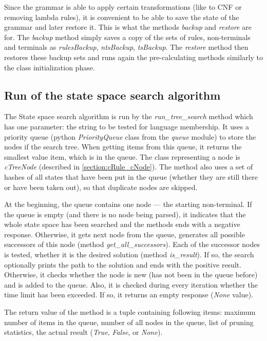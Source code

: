 Since the grammar is able to apply certain transformations (like to CNF or removing lambda rules), it is convenient to be able to save the state of the grammar and later restore it. This is what the methods \textit{backup} and \textit{restore} are for. The \textit{backup} method simply saves a copy of the sets of rules, non-terminals and terminals as \textit{rulesBackup}, \textit{ntsBackup}, \textit{tsBackup}. The \textit{restore} method then restores these backup sets and runs again the pre-calculating methods similarly to the class initialization phase.

\subsection{Run of the state space search algorithm}
The State space search algorithm is run by the \textit{run\_tree\_search} method which has one parameter: the string to be tested for language membership. It uses a priority queue (python \textit{PriorityQueue} class from the \textit{queue} module) to store the nodes if the search tree. When getting items from this queue, it returns the smallest value item, which is in the queue. The class representing a node is \textit{cTreeNode} (described in \ref{section:cRule_cNode}). The method also uses a set of hashes of all states that have been put in the queue (whether they are still there or have been taken out), so that duplicate nodes are skipped.

At the beginning, the queue contains one node --- the starting non-terminal. If the queue is empty (and there is no node being parsed), it indicates that the whole state space has been searched and the methods ends with a negative response. Otherwise, it gets next node from the queue, generates all possible successors of this node (method \textit{get\_all\_successors}). Each of the successor nodes is tested, whether it is the desired solution (method \textit{is\_result}). If so, the search optionally prints the path to the solution and ends with the positive result. Otherwise, it checks whether the node is new (has not been in the queue before) and is added to the queue. Also, it is checked during every iteration whether the time limit has been exceeded. If so, it returns an empty response (\textit{None} value).

The return value of the method is a tuple containing following items: maximum number of items in the queue, number of all nodes in the queue, list of pruning statistics, the actual result (\textit{True}, \textit{False}, or \textit{None}).

